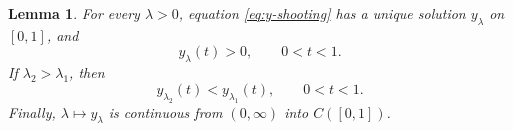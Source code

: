 \documentclass[12pt]{amsart}
\numberwithin{equation}{section}
\theoremstyle{plain}
\newtheorem{lemma}[theorem]{Lemma}
\theoremstyle{definition}
\begin{document}
\begin{lemma}
\label{lem:shooting-properties}
For every \(\lambda>0\), equation \eqref{eq:y-shooting} has a unique solution
\(y_\lambda\) on \([0,1]\), and
\begin{equation}
    \label{eq:y>0}
y_\lambda(t)>0,\qquad 0<t<1.
\end{equation}
  If
\(\lambda_2>\lambda_1\), then
\begin{equation}
 y_{\lambda_2}(t)<y_{\lambda_1}(t),
 \qquad 0<t<1.
 \label{eq:shooting-strict-order}
\end{equation}
Finally, \(\lambda\mapsto y_\lambda\) is continuous from \((0,\infty)\) into \(C([0,1])\).
\end{lemma}
\end{document}
